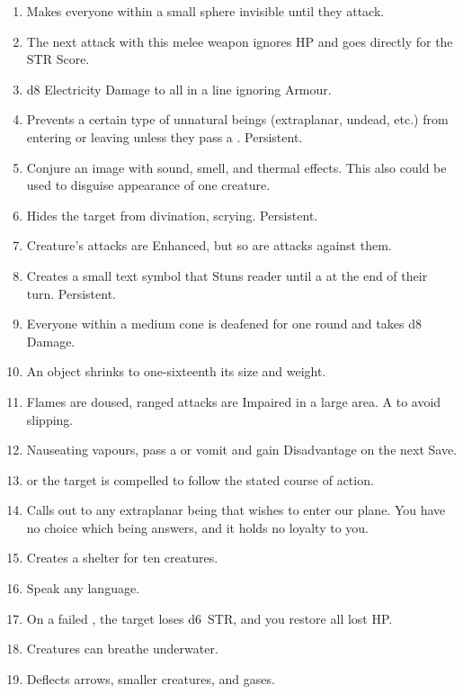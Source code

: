 \documentclass[itdr]{subfiles}
\begin{document}
\begin{enumerate}
	\item {} Makes everyone within a small sphere invisible until they attack.
	\item {} The next attack with this melee weapon ignores HP and goes directly for the STR Score.
	\item {} d8 Electricity Damage to all in a line ignoring Armour.
	\vfill
	\break
	\item {} Prevents a certain type of unnatural beings (extraplanar, undead, etc.) from entering or leaving unless they pass a . Persistent.
	\item {} Conjure an image with sound, smell, and thermal effects. This also could be used to disguise appearance of one creature.
	\item {} Hides the target from divination, scrying. Persistent.
	\item {} Creature's attacks are Enhanced, but so are attacks against them.
	\item {} Creates a small text symbol that Stuns reader until a  at the end of their turn. Persistent.
	\item {} Everyone within a medium cone is deafened for one round and takes d8 Damage.
	\item {} An object shrinks to one-sixteenth its size and weight.
	\item {} Flames are doused, ranged attacks are Impaired in a large area. A  to avoid slipping.
	\item {} Nauseating vapours, pass a  or vomit and gain Disadvantage on the next Save.
	\item {}  or the target is \mbox{compelled} to follow the stated course of action.
	\item {} Calls out to any extraplanar being that wishes to enter our plane. You have no choice which being answers, and it holds no loyalty to you.
	\item {} Creates a shelter for ten creatures.
	\item {} Speak any language.
	\item {} On a failed , the target loses d6~STR, and you restore all lost HP.
	\item {} Creatures can breathe underwater.
	\item {} Deflects arrows, smaller creatures, and gases.
\end{enumerate}
\end{document}
